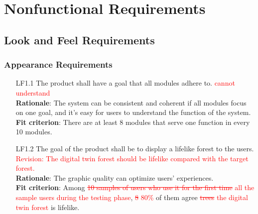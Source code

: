 \documentclass{article}
\begin{document}



\section{Nonfunctional Requirements}
\subsection{Look and Feel Requirements}
\subsubsection{Appearance Requirements}
\begin{enumerate}
    \item[LF1.1] The product shall have a goal that all modules adhere to. \textcolor{red}{cannot 
    understand}\\
    \textbf{Rationale}: The system can be consistent and coherent if all modules focus on one goal, and
     it's easy for users to understand the function of the system.\\
    \textbf{Fit criterion}:  There are at least 8 modules that serve one function in every 10 modules.
   
    \item[LF1.2] The goal of the product shall be to display a lifelike forest to the users.\\
    \textcolor{red}{Revision: The digital twin forest should be lifelike compared with the target
     forest.}\\
    \textbf{Rationale}: The graphic quality can optimize users' experiences.\\
    \textbf{Fit criterion}: Among \textcolor{red}{\st{10 samples of users who use it for the first
     time} all the sample users during the testing phase}, \textcolor{red}{\st{8} 80\%} of them agree
      \textcolor{red}{\st{trees} the digital twin forest} is lifelike.
\end{enumerate}
\end{document}
